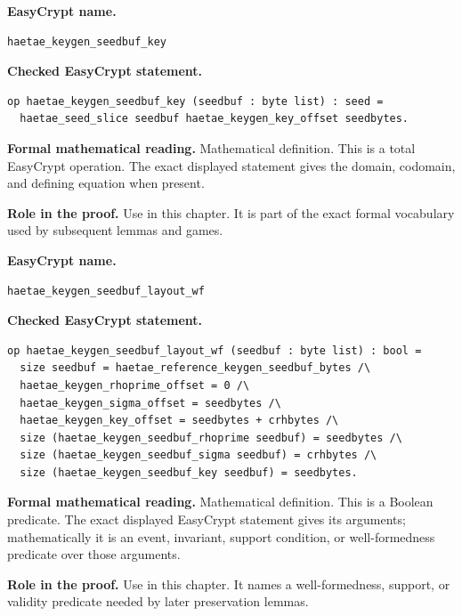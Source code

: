 \begin{formaldefinition}
\noindent\textbf{EasyCrypt name.}
\begin{lstlisting}[language=EasyCrypt,basicstyle=\ttfamily\scriptsize]
haetae_keygen_seedbuf_key
\end{lstlisting}
\noindent\textbf{Checked EasyCrypt statement.}
\begin{lstlisting}[language=EasyCrypt,basicstyle=\ttfamily\scriptsize]
op haetae_keygen_seedbuf_key (seedbuf : byte list) : seed =
  haetae_seed_slice seedbuf haetae_keygen_key_offset seedbytes.
\end{lstlisting}
\noindent\textbf{Formal mathematical reading.}
Mathematical definition. This is a total EasyCrypt operation.  The exact displayed statement gives the domain, codomain, and defining equation when present.

\noindent\textbf{Role in the proof.}
Use in this chapter. It is part of the exact formal vocabulary used by subsequent lemmas and games.

\end{formaldefinition}

\begin{formaldefinition}
\noindent\textbf{EasyCrypt name.}
\begin{lstlisting}[language=EasyCrypt,basicstyle=\ttfamily\scriptsize]
haetae_keygen_seedbuf_layout_wf
\end{lstlisting}
\noindent\textbf{Checked EasyCrypt statement.}
\begin{lstlisting}[language=EasyCrypt,basicstyle=\ttfamily\scriptsize]
op haetae_keygen_seedbuf_layout_wf (seedbuf : byte list) : bool =
  size seedbuf = haetae_reference_keygen_seedbuf_bytes /\
  haetae_keygen_rhoprime_offset = 0 /\
  haetae_keygen_sigma_offset = seedbytes /\
  haetae_keygen_key_offset = seedbytes + crhbytes /\
  size (haetae_keygen_seedbuf_rhoprime seedbuf) = seedbytes /\
  size (haetae_keygen_seedbuf_sigma seedbuf) = crhbytes /\
  size (haetae_keygen_seedbuf_key seedbuf) = seedbytes.
\end{lstlisting}
\noindent\textbf{Formal mathematical reading.}
Mathematical definition. This is a Boolean predicate.  The exact displayed EasyCrypt statement gives its arguments; mathematically it is an event, invariant, support condition, or well-formedness predicate over those arguments.

\noindent\textbf{Role in the proof.}
Use in this chapter. It names a well-formedness, support, or validity predicate needed by later preservation lemmas.

\end{formaldefinition}

